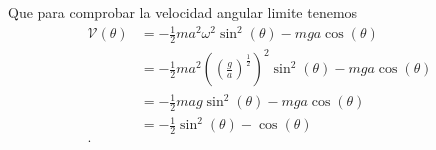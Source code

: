 \documentclass{report}
\begin{document}
Que para comprobar la velocidad angular limite tenemos
\begin{align*}
  \mathcal{V}\left( \theta \right) &= -\frac{1}{2}ma^2\omega^2\sin^2\left( \theta \right)  - mga\cos\left( \theta \right) \\
  &= -\frac{1}{2}ma^2\left( \left( \frac{g}{a} \right)^{\frac{1}{2}} \right)^2\sin^2\left( \theta \right)  - mga\cos\left( \theta \right)  \\
  &= -\frac{1}{2}mag\sin^2\left( \theta \right)  - mga\cos\left( \theta \right)  \\
  &= -\frac{1}{2}\sin^2\left( \theta \right) - \cos\left( \theta \right)  \\
.\end{align*}
\end{document}
